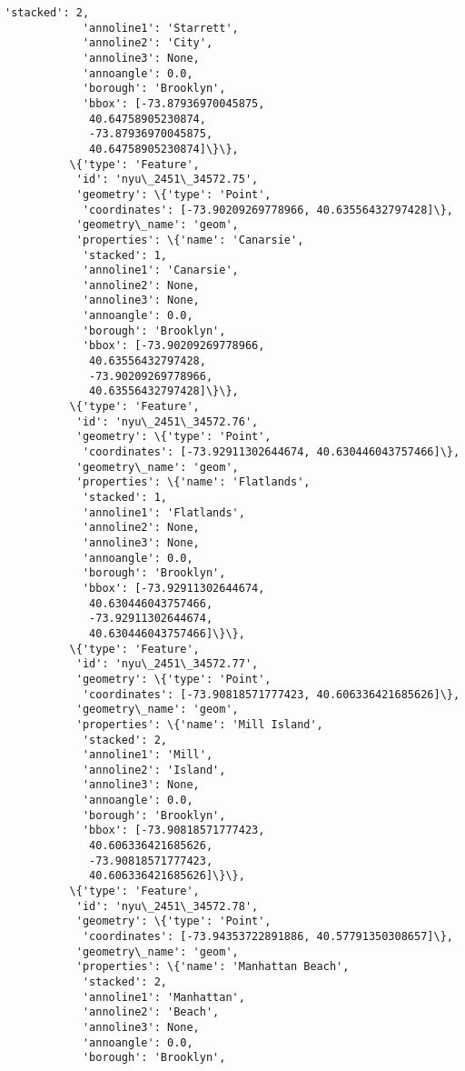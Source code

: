 \documentclass[11pt]{article}
\begin{document}
\begin{Verbatim}[commandchars=\\\{\}]
            'stacked': 2,
            'annoline1': 'Starrett',
            'annoline2': 'City',
            'annoline3': None,
            'annoangle': 0.0,
            'borough': 'Brooklyn',
            'bbox': [-73.87936970045875,
             40.64758905230874,
             -73.87936970045875,
             40.64758905230874]\}\},
          \{'type': 'Feature',
           'id': 'nyu\_2451\_34572.75',
           'geometry': \{'type': 'Point',
            'coordinates': [-73.90209269778966, 40.63556432797428]\},
           'geometry\_name': 'geom',
           'properties': \{'name': 'Canarsie',
            'stacked': 1,
            'annoline1': 'Canarsie',
            'annoline2': None,
            'annoline3': None,
            'annoangle': 0.0,
            'borough': 'Brooklyn',
            'bbox': [-73.90209269778966,
             40.63556432797428,
             -73.90209269778966,
             40.63556432797428]\}\},
          \{'type': 'Feature',
           'id': 'nyu\_2451\_34572.76',
           'geometry': \{'type': 'Point',
            'coordinates': [-73.92911302644674, 40.630446043757466]\},
           'geometry\_name': 'geom',
           'properties': \{'name': 'Flatlands',
            'stacked': 1,
            'annoline1': 'Flatlands',
            'annoline2': None,
            'annoline3': None,
            'annoangle': 0.0,
            'borough': 'Brooklyn',
            'bbox': [-73.92911302644674,
             40.630446043757466,
             -73.92911302644674,
             40.630446043757466]\}\},
          \{'type': 'Feature',
           'id': 'nyu\_2451\_34572.77',
           'geometry': \{'type': 'Point',
            'coordinates': [-73.90818571777423, 40.606336421685626]\},
           'geometry\_name': 'geom',
           'properties': \{'name': 'Mill Island',
            'stacked': 2,
            'annoline1': 'Mill',
            'annoline2': 'Island',
            'annoline3': None,
            'annoangle': 0.0,
            'borough': 'Brooklyn',
            'bbox': [-73.90818571777423,
             40.606336421685626,
             -73.90818571777423,
             40.606336421685626]\}\},
          \{'type': 'Feature',
           'id': 'nyu\_2451\_34572.78',
           'geometry': \{'type': 'Point',
            'coordinates': [-73.94353722891886, 40.57791350308657]\},
           'geometry\_name': 'geom',
           'properties': \{'name': 'Manhattan Beach',
            'stacked': 2,
            'annoline1': 'Manhattan',
            'annoline2': 'Beach',
            'annoline3': None,
            'annoangle': 0.0,
            'borough': 'Brooklyn',

\end{Verbatim}
\end{document}

